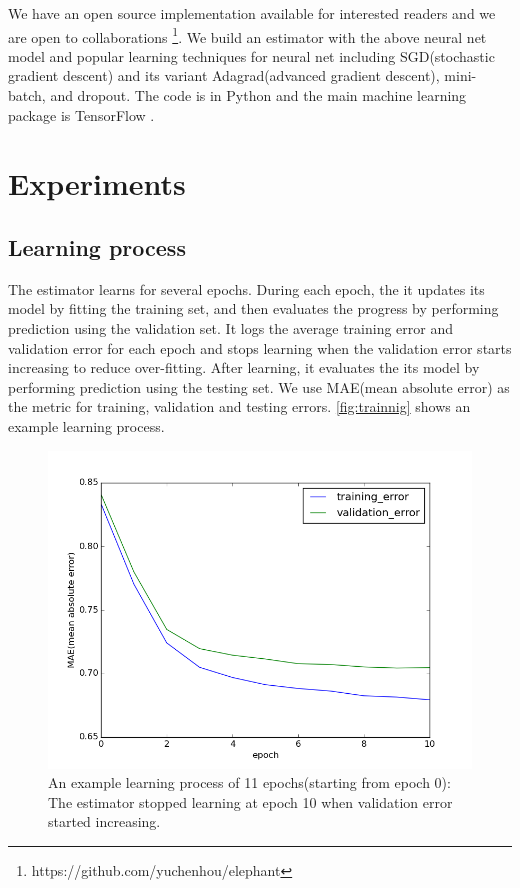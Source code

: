 \documentclass{article}
\begin{document}
We have an open source implementation available for interested readers and we 
are open to collaborations \footnote{https://github.com/yuchenhou/elephant}.
We build an estimator with the above neural net model and popular learning 
techniques for neural net including SGD(stochastic gradient descent) and its 
variant Adagrad(advanced gradient descent), mini-batch, and dropout.
The code is in Python and the main machine learning package is TensorFlow 
\cite{tensorflow2015-whitepaper}.

\section{Experiments}

\subsection{Learning process}
The estimator learns for several epochs.
During each epoch, the it updates its model by fitting the training set, and 
then evaluates the progress by performing prediction using the validation set.
It logs the average training error and validation error for each epoch and 
stops learning when the validation error starts increasing to reduce 
over-fitting.
After learning, it evaluates the its model by performing prediction using the 
testing set.
We use MAE(mean absolute error) as the metric for training, validation and 
testing errors.
\autoref{fig:trainnig} shows an example learning process.
\begin{figure}[h]
	\centering
	\includegraphics[width=0.5\linewidth]{training}
	\caption{An example learning process of 11 epochs(starting from epoch 0): 
	The estimator stopped learning at epoch 10 when validation error started 
	increasing.}
	\label{fig:trainnig}
\end{figure}
\end{document}
